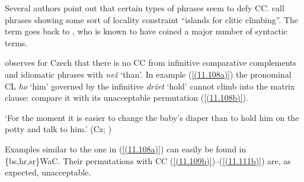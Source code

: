 
Several authors point out that certain types of phrases seem to defy CC. \citet[245]{FranksKing00} call phrases showing some sort of locality constraint “islands for clitic climbing”. The term goes back to \citet{Ross67}, who is known to have coined a major number of syntactic terms. 

\citet[76]{Junghanns02} observes for Czech that there is no CC from infinitive comparative complements and idiomatic phrases with \textit{než} ‘than’. In example (\ref{(11.108a)}) the pronominal CL \textit{ho} ‘him’ governed by the infinitive \textit{držet} ‘hold’ cannot climb into the matrix clause: compare it with its unacceptable permutation (\ref{(11.108b)}). 

\begin{exe}\ex
\begin{xlist}
\end{xlist}
\glt ‘For the moment it is easier to change the baby’s diaper than to hold him on the potty and talk to him.’
\hfill (Cz; \citealt[76]{Junghanns02})
\end{exe}

\noindent Examples similar to the one in (\ref{(11.108a)}) can easily be found in \{bs,hr,sr\}WaC. Their permutations with CC (\ref{(11.109b)})--(\ref{(11.111b)}) are, as expected, unacceptable.

